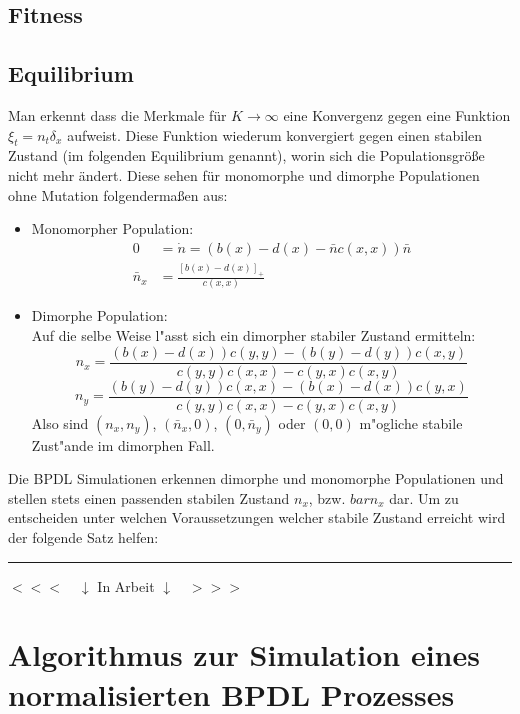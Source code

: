 \documentclass[11pt, a4paper, german]{article}
\begin{document}
	\subsection{Fitness}
	
	\subsection{Equilibrium}
	Man erkennt dass die Merkmale für $ K \to \infty $ eine Konvergenz gegen eine Funktion $ \xi_t = n_t \delta_x $ aufweist. Diese Funktion wiederum konvergiert gegen einen stabilen Zustand (im folgenden Equilibrium genannt), worin sich die Populationsgröße nicht mehr ändert. Diese sehen für monomorphe und dimorphe Populationen ohne Mutation folgendermaßen aus:
	\begin{itemize}
		\item Monomorpher Population:\\
			\begin{align*}
			0 & = \dot{n} = (b(x) - d(x) - \bar{n}c(x,x))\bar{n}\\
			\bar{n}_x &= \frac{\left[ b(x)-d(x) \right]_+}{c(x,x)}
			\end{align*}
		\item Dimorphe Population:\\
			Auf die selbe Weise l"asst sich ein dimorpher stabiler Zustand ermitteln:
			\[ n_x = \frac{(b(x) - d(x))c(y,y)-(b(y)-d(y))c(x,y)}{c(y,y)c(x,x) - c(y,x)c(x,y)} \]
			\[ n_y = \frac{(b(y) - d(y))c(x,x)-(b(x)-d(x))c(y,x)}{c(y,y)c(x,x) - c(y,x)c(x,y)} \]
			Also sind $ (n_x, n_y) $, $ (\bar{n}_x, 0)$, $ (0, \bar{n}_y)$ oder $ (0,0) $ m"ogliche stabile Zust"ande im dimorphen Fall.
	\end{itemize}
	Die BPDL Simulationen erkennen dimorphe und monomorphe Populationen und stellen stets einen passenden stabilen Zustand $ n_x $, bzw. $ bar{n}_x $ dar. Um zu entscheiden unter welchen Voraussetzungen welcher stabile Zustand erreicht wird der folgende Satz helfen:


\clearpage

\noindent\rule{\textwidth}{2pt}
\begin{center}
	$ <<< \quad \downarrow $ In Arbeit $ \downarrow \quad >>> $
\end{center}
	
\section{Algorithmus zur Simulation eines normalisierten BPDL Prozesses}
\end{document}
